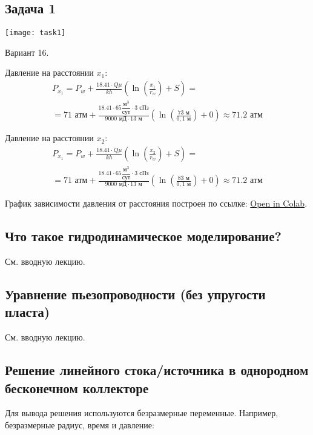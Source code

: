 \documentclass[main.tex]{subfiles}
\begin{document}
\subsection{Задача 1}

\texttt{[image: task1]}

Вариант 16.

Давление на расстоянии $x_1$:
\begin{multline}
P_{x_1}=P_w+\frac{18.41\cdot Q\mu}{kh}\left(\ln{\left(\frac{x_1}{r_w}\right)+S}\right)
=\\=71\text{ атм}+\frac{18.41\cdot 65\dfrac{\text{м}^3}{\text{сут}}\cdot3\text{ сПз}}{9000\text{ мД}\cdot 13\text{ м}}\left(\ln{\left(\frac{73\text{ м}}{0,1\text{ м}}\right)}+0\right)\approx 71.2\text{ атм}
\end{multline}

Давление на расстоянии $x_2$:
\begin{multline}
P_{x_1}=P_w+\frac{18.41\cdot Q\mu}{kh}\left(\ln{\left(\frac{x_2}{r_w}\right)+S}\right)
=\\=71\text{ атм}+\frac{18.41\cdot 65\dfrac{\text{м}^3}{\text{сут}}\cdot3\text{ сПз}}{9000\text{ мД}\cdot 13\text{ м}}\left(\ln{\left(\frac{83\text{ м}}{0,1\text{ м}}\right)}+0\right)\approx 71.2\text{ атм}
\end{multline}

График зависимости давления от расстояния построен по ссылке: \href{https://colab.research.google.com/github/mualal/notebooks-source/blob/master/6_pressure.ipynb}{Open in Colab}.

\subsection{Что такое гидродинамическое моделирование?}

См. вводную лекцию.

\subsection{Уравнение пьезопроводности (без упругости пласта)}

См. вводную лекцию.

\subsection{Решение линейного стока/источника в однородном бесконечном коллекторе}

Для вывода решения используются безразмерные переменные. Например, безразмерные радиус, время и давление:
\end{document}
